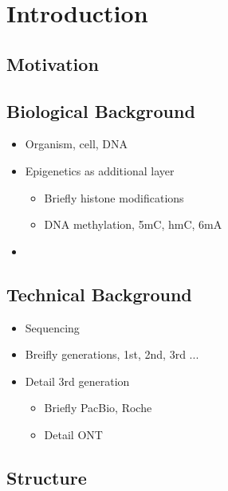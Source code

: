 \chapter{Introduction}
\label{sec:intro}



\section{Motivation}
\label{sec:intro:motivation}

\section{Biological Background}
\label{sec:intro:bio}

\begin{itemize}
    \item Organism, cell, DNA
    \item Epigenetics as additional layer
    \begin{itemize}
        \item Briefly histone modifications
        \item DNA methylation, 5mC, hmC, 6mA
    \end{itemize}
    \item 
\end{itemize}


\section{Technical Background}
\label{sec:intro:sequencing}

\begin{itemize}
    \item Sequencing
    \item Breifly generations, 1st, 2nd, 3rd ...
    \item Detail 3rd generation
    \begin{itemize}
        \item Briefly PacBio, Roche
        \item Detail ONT
    \end{itemize}
\end{itemize}

\section{Structure}
\label{sec:intro:structure}



